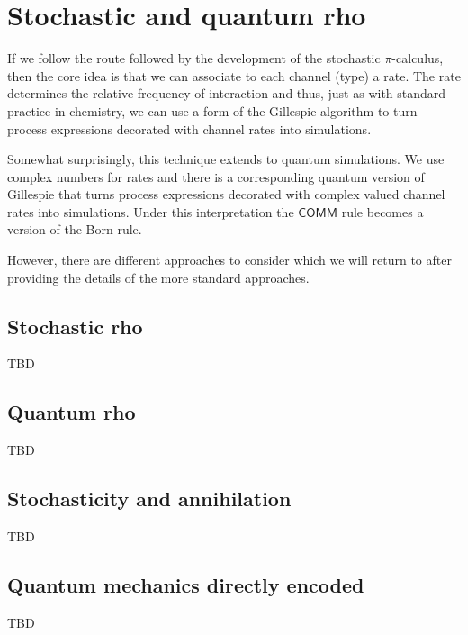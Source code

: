 \section{Stochastic and quantum rho}

If we follow the route followed by the development of the stochastic
$\pi$-calculus, then the core idea is that we can associate to each
channel (type) a rate. The rate determines the relative frequency of
interaction and thus, just as with standard practice in chemistry, we
can use a form of the Gillespie algorithm to turn process expressions
decorated with channel rates into simulations.

Somewhat surprisingly, this technique extends to quantum
simulations. We use complex numbers for rates and there is a
corresponding quantum version of Gillespie that turns process
expressions decorated with complex valued channel rates into
simulations. Under this interpretation the $\mathsf{COMM}$ rule becomes
a version of the Born rule.

However, there are different approaches to consider which we will
return to after providing the details of the more standard approaches.

\subsection{Stochastic rho}

TBD

\subsection{Quantum rho}

TBD

\subsection{Stochasticity and annihilation}

TBD

\subsection{Quantum mechanics directly encoded}

TBD
